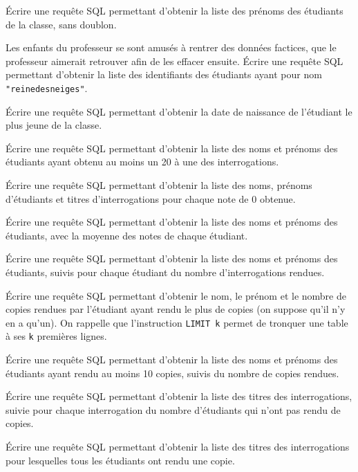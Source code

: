 \medskip{}

\question{} Écrire une requête SQL permettant d'obtenir la liste des prénoms des étudiants de la classe, sans doublon.

\medskip{}

\question{} Les enfants du professeur se sont amusés à rentrer des données factices, que le professeur aimerait retrouver afin de les effacer ensuite. 
Écrire une requête SQL permettant d'obtenir la liste des identifiants des étudiants ayant pour nom \texttt{"reinedesneiges"}.

\medskip{}

\question{} Écrire une requête SQL permettant d'obtenir la date de naissance de l'étudiant le plus jeune de la classe. 

\medskip{}

\question{} Écrire une requête SQL permettant d'obtenir la liste des noms et prénoms des étudiants ayant obtenu au moins un 20 à une des interrogations. 

\medskip{}

\question{} Écrire une requête SQL permettant d'obtenir la liste des noms, prénoms d'étudiants et titres d'interrogations pour chaque note de 0 obtenue. 

\medskip{}

\question{} Écrire une requête SQL permettant d'obtenir la liste des noms et prénoms des étudiants, avec la moyenne des notes de chaque étudiant.

\medskip{}

\question{} Écrire une requête SQL permettant d'obtenir la liste des noms et prénoms des étudiants, suivis pour chaque étudiant du nombre d'interrogations rendues.

\medskip{} 

\question{} Écrire une requête SQL permettant d'obtenir le nom, le prénom et le nombre de copies rendues par l'étudiant ayant rendu le plus de copies (on suppose qu'il n'y en a qu'un). 
  On rappelle que l'instruction \texttt{LIMIT k} permet de tronquer une table à ses \texttt{k} premières lignes.
  
\medskip{}

\question{} Écrire une requête SQL permettant d'obtenir la liste des noms et prénoms des étudiants ayant rendu au moins 10 copies, suivis du nombre de copies rendues. 

\medskip{}

\question{} Écrire une requête SQL permettant d'obtenir la liste des titres des interrogations, suivie pour chaque interrogation du nombre d'étudiants qui n'ont pas rendu de copies. 

\medskip{}

\question{} Écrire une requête SQL permettant d'obtenir la liste des titres des interrogations pour lesquelles tous les étudiants ont rendu une copie. 

